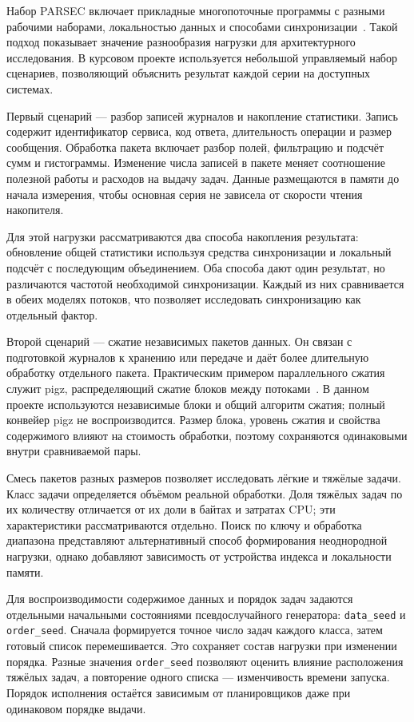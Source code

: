 Набор PARSEC включает прикладные многопоточные программы с разными рабочими наборами, локальностью
  данных и способами синхронизации~\cite{parsec2008}. Такой подход показывает значение разнообразия
  нагрузки для архитектурного исследования. В курсовом проекте используется небольшой управляемый
  набор сценариев, позволяющий объяснить результат каждой серии на доступных системах.

Первый сценарий — разбор записей журналов и накопление статистики. Запись содержит идентификатор
  сервиса, код ответа, длительность операции и размер сообщения. Обработка пакета включает разбор
  полей, фильтрацию и подсчёт сумм и гистограммы. Изменение числа записей в пакете меняет соотношение
  полезной работы и расходов на выдачу задач. Данные размещаются в памяти до начала измерения,
  чтобы основная серия не зависела от скорости чтения накопителя.

Для этой нагрузки рассматриваются два способа накопления результата: обновление общей статистики
  используя средства синхронизации и локальный подсчёт с последующим объединением. Оба способа дают один результат,
  но различаются частотой необходимой синхронизации. Каждый из них сравнивается в обеих моделях потоков,
  что позволяет исследовать синхронизацию как отдельный фактор.

Второй сценарий — сжатие независимых пакетов данных. Он связан с подготовкой журналов к хранению
  или передаче и даёт более длительную обработку отдельного пакета. Практическим примером
  параллельного сжатия служит pigz, распределяющий сжатие блоков между потоками~\cite{pigz_manual}.
  В данном проекте используются независимые блоки и общий алгоритм сжатия; полный конвейер pigz
  не воспроизводится. Размер блока, уровень сжатия и свойства содержимого влияют на стоимость
  обработки, поэтому сохраняются одинаковыми внутри сравниваемой пары.

Смесь пакетов разных размеров позволяет исследовать лёгкие и тяжёлые задачи. Класс задачи
  определяется объёмом реальной обработки. Доля тяжёлых задач по их количеству отличается
  от их доли в байтах и затратах CPU; эти характеристики рассматриваются отдельно.
  Поиск по ключу и обработка диапазона представляют альтернативный способ формирования
  неоднородной нагрузки, однако добавляют зависимость от устройства индекса и локальности памяти.

Для воспроизводимости содержимое данных и порядок задач задаются отдельными начальными состояниями
  псевдослучайного генератора: \texttt{data\_seed} и \texttt{order\_seed}. Сначала формируется
  точное число задач каждого класса, затем готовый список перемешивается. Это сохраняет состав
  нагрузки при изменении порядка. Разные значения \texttt{order\_seed} позволяют оценить влияние
  расположения тяжёлых задач, а повторение одного списка — изменчивость времени запуска.
  Порядок исполнения остаётся зависимым от планировщиков даже при одинаковом порядке выдачи.


